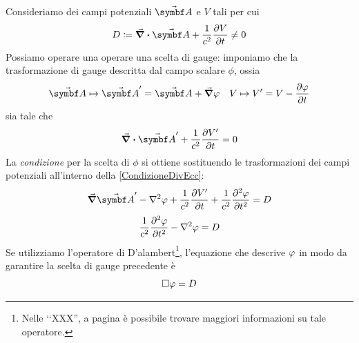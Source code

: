 Consideriamo dei campi potenziali $\vba{A}$ e $V$ tali per cui
\begin{equation*}
	D\coloneqq\div{\vba{A}}+\frac{1}{c^2}\pdv{V}{t}\neq 0
\end{equation*}
Possiamo operare una operare una scelta di gauge: imponiamo che la trasformazione di gauge descritta dal campo scalare $\phi$, ossia
\begin{align*}
	\vba{A}\mapsto\vba{A}'=\vba{A}+\grad{\oldphi}&&
	V\mapsto V'=V-\pdv{\phi}{t}
\end{align*}
sia tale che
\begin{equation}
	\div{\vba{A}'}+\frac{1}{c^2}\pdv{V'}{t}=0\label{CondizioneDivEcc}
\end{equation}
La \textit{condizione} per la scelta di $\phi$ si ottiene sostituendo le trasformazioni dei campi potenziali all'interno della \eqref{CondizioneDivEcc}:
\begin{equation*}
	\grad{\vba{A}'}-\laplacian{\oldphi}+\frac{1}{c^2}\pdv{V'}{t}+\frac{1}{c^2}\pdv[2]{\oldphi}{t}=D
\end{equation*}
\begin{equation}
	\frac{1}{c^2}\pdv[2]{\phi}{t}-\laplacian{\oldphi}=D
\end{equation}
Se utilizziamo l'operatore di D'alambert\footnote{Nelle ‘‘XXX'', a pagina \pageref{dalembertiano} è possibile trovare maggiori informazioni su tale operatore.}, l'equazione che descrive $\oldphi$ in modo da garantire la scelta di gauge precedente è
\begin{equation}
	\Box{\oldphi}=D
\end{equation}

